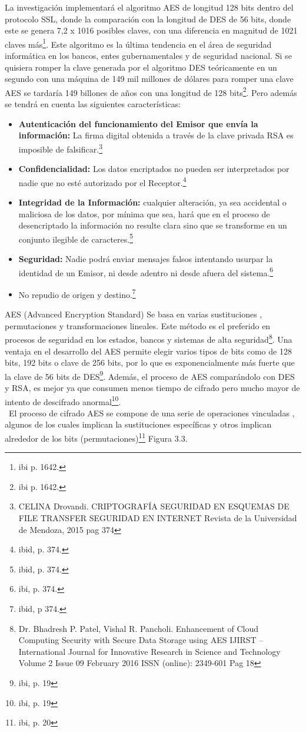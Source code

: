\documentclass[a4paper,openright,12pt]{book}
\theoremstyle{definition}
\theoremstyle{remark}
\begin{document}
La investigación implementará el algoritmo AES de longitud 128 bits dentro del protocolo SSL, donde la comparación con la longitud de DES de 56 bits, donde este se genera 7,2 x 1016 posibles claves, con una diferencia en magnitud de 1021 claves más\footnote{ibi p. 1642.}. Este algoritmo es la última tendencia en el área de seguridad informática en los bancos, entes gubernamentales y de seguridad nacional. Si se quisiera romper la clave generada por el algoritmo DES teóricamente en un segundo con una máquina de 149 mil millones de dólares para romper una clave AES se tardaría 149 billones de años con una longitud de 128 bits\footnote{ibi p. 1642.}. Pero además se tendrá en cuenta las siguientes características:
\begin{itemize}
\item \textbf{Autenticación del funcionamiento del Emisor que envía la información:} La firma digital obtenida a través de la clave privada RSA es imposible de falsificar.\footnote{CELINA Drovandi. CRIPTOGRAFÍA
SEGURIDAD EN ESQUEMAS DE FILE TRANSFER SEGURIDAD EN INTERNET Revista de la Universidad de Mendoza, 2015 pag 374}
\item \textbf{Confidencialidad:} Los datos encriptados no pueden ser interpretados por nadie que no esté autorizado por el Receptor.\footnote{ibid, p. 374.}
\item \textbf{Integridad de la Información:} cualquier alteración, ya sea accidental o maliciosa de los datos, por mínima que sea, hará que en el proceso de desencriptado la información no resulte clara sino que se transforme en un conjunto ilegible de caracteres.\footnote{ibid, p. 374.}
\item \textbf{Seguridad:} Nadie podrá enviar mensajes falsos intentando usurpar la identidad de un Emisor, ni desde adentro ni desde afuera del sistema.\footnote{ibi, p. 374.}
\item No repudio de origen y destino.\footnote{ibid, p 374.}
\end{itemize}

AES (Advanced Encryption Standard) Se basa en varias sustituciones , permutaciones y transformaciones lineales. Este método es el preferido en procesos de seguridad en los estados, bancos y sistemas de alta seguridad\footnote{Dr. Bhadresh P. Patel, Vishal R. Pancholi. Enhancement of Cloud Computing Security with Secure Data Storage using AES IJIRST –International Journal for Innovative Research in Science and Technology Volume 2 Issue 09 February 2016 ISSN (online): 2349-601 Pag 18}. Una ventaja en el desarrollo del AES permite elegir varios tipos de bits como de 128 bits, 192 bits o clave de 256 bits, por lo que es exponencialmente más fuerte que la clave de 56 bits de DES\footnote{ibi, p. 19}. Además, el proceso de AES comparándolo con DES y RSA, es mejor ya que consumen menos tiempo de cifrado pero mucho mayor de intento de descifrado anormal\footnote{ibi, p. 19}.\\\
El proceso de cifrado AES se compone de una serie de operaciones vinculadas , algunos de los cuales implican la sustituciones específicas y otros implican alrededor de los bits (permutaciones)\footnote{ibi, p.  20} Figura 3.3. 
\end{document}
